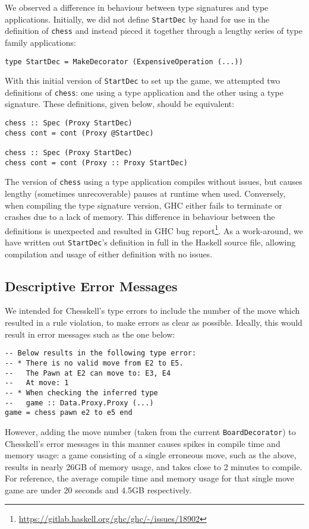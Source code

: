 \documentclass[12pt, a4paper, bibliography=totocnumbered]{scrreprt}
\newcommand{\inline}[1]{\lstinline[basicstyle=\ttfamily\footnotesize]{#1}}
\begin{document}
We observed a difference in behaviour between type signatures and type applications. Initially, we did not define \inline{StartDec} by hand for use in the definition of \inline{chess} and instead pieced it together through a lengthy series of type family applications:
\begin{lstlisting}
type StartDec = MakeDecorator (ExpensiveOperation (...))
\end{lstlisting}
With this initial version of \inline{StartDec} to set up the game, we attempted two definitions of \inline{chess}: one using a type application and the other using a type signature. These definitions, given below, should be equivalent:
\begin{lstlisting}
chess :: Spec (Proxy StartDec)
chess cont = cont (Proxy @StartDec)

chess :: Spec (Proxy StartDec)
chess cont = cont (Proxy :: Proxy StartDec)
\end{lstlisting}
The version of \inline{chess} using a type application compiles without issues, but causes lengthy (sometimes unrecoverable) pauses at runtime when used. Conversely, when compiling the type signature version, GHC either fails to terminate or crashes due to a lack of memory. This difference in behaviour between the definitions is unexpected and resulted in GHC bug report\footnote{\url{https://gitlab.haskell.org/ghc/ghc/-/issues/18902}}. As a work-around, we have written out \inline{StartDec}'s definition in full in the Haskell source file, allowing compilation and usage of either definition with no issues.

\subsection{Descriptive Error Messages}

We intended for Chesskell's type errors to include the number of the move which resulted in a rule violation, to make errors as clear as possible. Ideally, this would result in error messages such as the one below:

\begin{lstlisting}
-- Below results in the following type error:
-- * There is no valid move from E2 to E5.
--   The Pawn at E2 can move to: E3, E4
--   At move: 1
-- * When checking the inferred type
--   game :: Data.Proxy.Proxy (...)
game = chess pawn e2 to e5 end
\end{lstlisting}

However, adding the move number (taken from the current \inline{BoardDecorator}) to Chesskell's error messages in this manner causes spikes in compile time and memory usage: a game consisting of a single erroneous move, such as the above, results in nearly 26GB of memory usage, and takes close to 2 minutes to compile. For reference, the average compile time and memory usage for that single move game are under 20 seconds and 4.5GB respectively.
\end{document}

